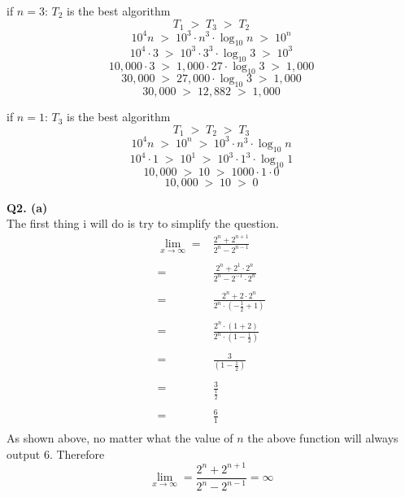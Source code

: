 \documentclass[a4paper,12pt]{article}
\begin{document}
if $n=3$: $T_2$ is the best algorithm
$$ T_1 \; > \; T_3 \; > \; T_2$$
$$ 10^4n \; > \; 10^3 \cdot n^3 \cdot  \log_{10} n \; > \; 10^{n} $$
$$ 10^4 \cdot 3 \; > \; 10^3 \cdot 3^3 \cdot  \log_{10} 3 \; > \; 10^{3} $$
$$ 10,000 \cdot 3 \; > \; 1,000 \cdot 27 \cdot  \log_{10} 3 \; > \; 1,000 $$
$$ 30,000 \; > \; 27,000 \cdot  \log_{10} 3 \; > \; 1,000 $$
$$ 30,000 \; > \; 12,882 \; > \; 1,000 $$

if $n=1$: $T_3$ is the best algorithm 
$$ T_1 \; > \; T_2 \; > \; T_3$$
$$ 10^4n \; > \; 10^{n} \; > \; 10^3 \cdot n^3 \cdot  \log_{10} n$$
$$ 10^4 \cdot 1 \; > \; 10^{1} \; > \; 10^3 \cdot 1^3 \cdot  \log_{10} 1$$
$$ 10,000 \; > \; 10 \; > \; 1000 \cdot 1 \cdot  0$$
$$ 10,000 \; > \; 10 \; > \; 0$$

\newpage
\noindent \textbf{Q2. (a)}\\
The first thing i will do is try to simplify the question.
\begin{equation}
\begin{split}
\lim\limits_{x \to \infty}={}& \frac{2^n + 2^{n+1}}{2^n - 2^{n-1}} \\
							\\
							={}& \frac{2^n + 2^1 \cdot 2^n}{2^n - 2^{-1} \cdot 2^n} \\
							\\
							={}& \frac{2^n + 2 \cdot 2^n}{2^n \cdot (-\frac{1}{2} + 1)} \\
							\\
							={}& \frac{2^n \cdot (1 + 2)}{2^n \cdot (1-\frac{1}{2})} \\
							\\
							={}& \frac{3}{(1-\frac{1}{2})} \\
							\\
							={}& \frac{3}{\frac{1}{2}} \\
							\\
							={}& \frac{6}{1} \\
\end{split}
\end{equation}
As shown above, no matter what the value of $n$ the above function will always output $6$. Therefore
$$\lim\limits_{x \to \infty} = \frac{2^n + 2^{n+1}}{2^n - 2^{n-1}} = \infty$$
\end{document}
